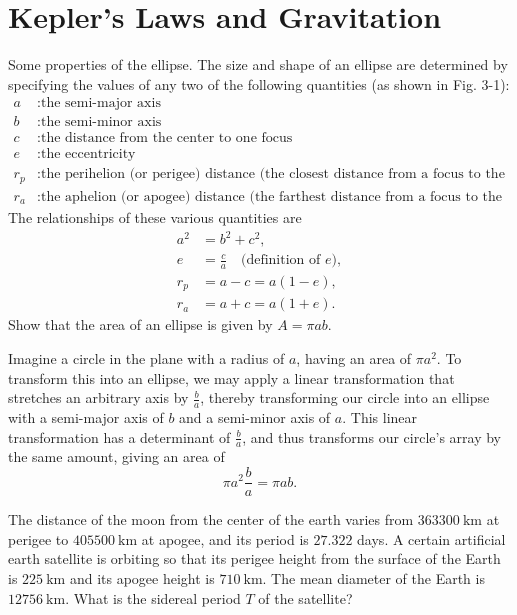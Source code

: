 \documentclass[../feynman-lectures-on-physics.tex]{subfiles}
\begin{document}
\section{Kepler's Laws and Gravitation}

\begin{questions}

	\question Some properties of the ellipse. The size and shape of an ellipse are determined by specifying the values of any two of the following quantities (as shown in Fig. 3-1):
	\begin{align*}
		a &: \text{the semi-major axis} \\
		b &: \text{the semi-minor axis} \\
		c &: \text{the distance from the center to one focus} \\
		e &: \text{the eccentricity} \\
		r_p &: \text{the perihelion (or perigee) distance (the closest distance from a focus to the ellipse)} \\
		r_a &: \text{the aphelion (or apogee) distance (the farthest distance from a focus to the ellipse)}
	\end{align*}
	The relationships of these various quantities are
	\begin{align*}
		a^2 &= b^2 + c^2, \\
		e &= \frac{c}{a}\quad\text{(definition of $e$)}, \\
		r_p &= a - c = a(1 - e), \\
		r_a &= a + c = a(1 + e).
	\end{align*}
	Show that the area of an ellipse is given by $A = \pi{ab}$.

	\begin{solution}
		Imagine a circle in the plane with a radius of $a$, having an area of $\pi{a}^2$. To transform this into an ellipse, we may apply a linear transformation that stretches an arbitrary axis by $\frac{b}{a}$, thereby transforming our circle into an ellipse with a semi-major axis of $b$ and a semi-minor axis of $a$. This linear transformation has a determinant of $\frac{b}{a}$, and thus transforms our circle's array by the same amount, giving an area of
		\[
		\pi{a^2}\frac{b}{a} = \pi{ab}.
		\] 
	\end{solution}

	\question The distance of the moon from the center of the earth varies from $\SI{363300}{\kilo\meter}$ at perigee to $\SI{405500}{\kilo\meter}$ at apogee, and its period is $27.322$ days. A certain artificial earth satellite is orbiting so that its perigee height from the surface of the Earth is $\SI{225}{\kilo\meter}$ and its apogee height is $\SI{710}{\kilo\meter}$. The mean diameter of the Earth is $\SI{12756}{\kilo\meter}$. What is the sidereal period $T$ of the satellite?


\end{questions}
\end{document}
